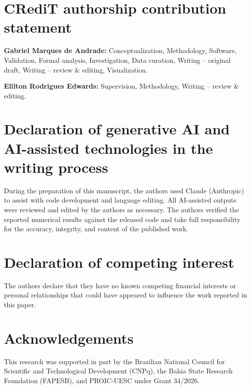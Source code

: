 \documentclass[a4paper,fleqn]{cas-dc}
\begin{document}
\begingroup
\sloppy

\section*{CRediT authorship contribution statement}
\textbf{Gabriel Marques de Andrade:} Conceptualization, Methodology, Software, Validation, Formal analysis, Investigation, Data curation, Writing -- original draft, Writing -- review \& editing, Visualization.

\textbf{Elilton Rodrigues Edwards:} Supervision, Methodology, Writing -- review \& editing.

\fussy
\endgroup

\section*{Declaration of generative AI and AI-assisted technologies in the writing process}
During the preparation of this manuscript, the authors used Claude (Anthropic) to assist with code development and language editing. All AI-assisted outputs were reviewed and edited by the authors as necessary. The authors verified the reported numerical results against the released code and take full responsibility for the accuracy, integrity, and content of the published work.

\fussy
\section*{Declaration of competing interest}
The authors declare that they have no known competing financial interests or personal relationships that could have appeared to influence the work reported in this paper.

\section*{Acknowledgements}
This research was supported in part by the Brazilian National Council for Scientific and Technological Development (CNPq), the Bahia State Research Foundation (FAPESB), and PROIC-UESC under Grant 34/2026.



\end{document}
